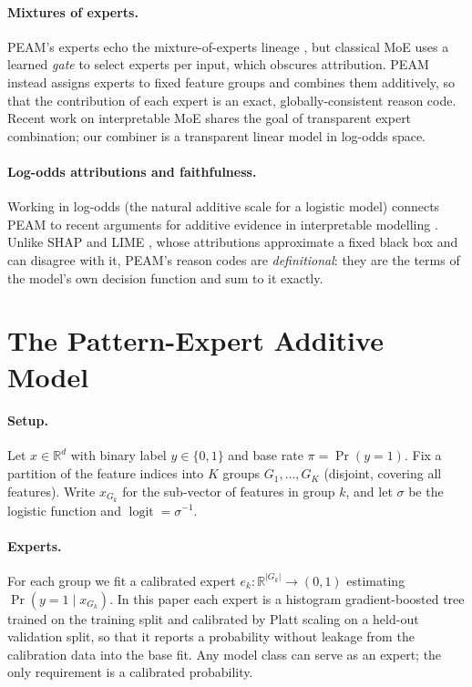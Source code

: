 \documentclass{article}
\newcommand{\logit}{\operatorname{logit}}
\newcommand{\sigm}{\sigma}
\newcommand{\RR}{\mathbb{R}}
\begin{document}
\paragraph{Mixtures of experts.} PEAM's experts echo the mixture-of-experts
lineage \citep{jacobs1991moe}, but classical MoE uses a learned \emph{gate} to
select experts per input, which obscures attribution. PEAM instead assigns
experts to fixed feature groups and combines them additively, so that the
contribution of each expert is an exact, globally-consistent reason code. Recent
work on interpretable MoE \citep{ismail2023interpretable_moe} shares the goal of
transparent expert combination; our combiner is a transparent linear model in
log-odds space.

\paragraph{Log-odds attributions and faithfulness.} Working in log-odds (the
natural additive scale for a logistic model) connects PEAM to recent arguments
for additive evidence in interpretable modelling \citep{dervovic2022logodds}.
Unlike SHAP \citep{lundberg2017shap} and LIME \citep{ribeiro2016lime}, whose
attributions approximate a fixed black box and can disagree with it, PEAM's
reason codes are \emph{definitional}: they are the terms of the model's own
decision function and sum to it exactly.

\section{The Pattern-Expert Additive Model}
\label{sec:method}

\paragraph{Setup.} Let $x \in \RR^d$ with binary label $y \in \{0,1\}$ and base
rate $\pi = \Pr(y{=}1)$. Fix a partition of the feature indices into $K$ groups
$G_1,\dots,G_K$ (disjoint, covering all features). Write $x_{G_k}$ for the
sub-vector of features in group $k$, and let $\sigm$ be the logistic function and
$\logit = \sigm^{-1}$.

\paragraph{Experts.} For each group we fit a calibrated expert
$e_k : \RR^{|G_k|} \to (0,1)$ estimating $\Pr(y{=}1 \mid x_{G_k})$. In this paper
each expert is a histogram gradient-boosted tree trained on the training split
and calibrated by Platt scaling \citep{platt1999calibration} on a held-out
validation split, so that it reports a probability without leakage from the
calibration data into the base fit. Any model class can serve as an expert; the
only requirement is a calibrated probability.
\end{document}
